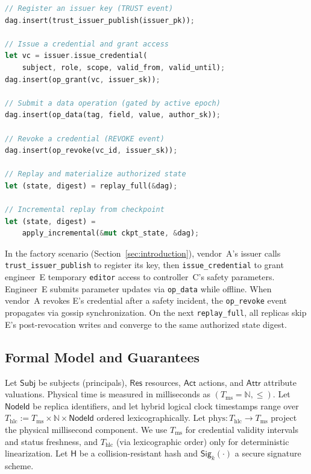 \documentclass[10pt,journal,compsoc]{IEEEtran}
\begin{document}
\begin{lstlisting}[language=Rust,caption={Simplified API surface of \textit{equack-core}.},label={lst:api}]
// Register an issuer key (TRUST event)
dag.insert(trust_issuer_publish(issuer_pk));

// Issue a credential and grant access
let vc = issuer.issue_credential(
    subject, role, scope, valid_from, valid_until);
dag.insert(op_grant(vc, issuer_sk));

// Submit a data operation (gated by active epoch)
dag.insert(op_data(tag, field, value, author_sk));

// Revoke a credential (REVOKE event)
dag.insert(op_revoke(vc_id, issuer_sk));

// Replay and materialize authorized state
let (state, digest) = replay_full(&dag);

// Incremental replay from checkpoint
let (state, digest) =
    apply_incremental(&mut ckpt_state, &dag);
\end{lstlisting}

In the factory scenario (Section~\ref{sec:introduction}), vendor~A's issuer calls \texttt{trust\_issuer\_publish} to register its key, then \texttt{issue\_credential} to grant engineer~E temporary \texttt{editor} access to controller~C's safety parameters. Engineer~E submits parameter updates via \texttt{op\_data} while offline. When vendor~A revokes E's credential after a safety incident, the \texttt{op\_revoke} event propagates via gossip synchronization. On the next \texttt{replay\_full}, all replicas skip E's post-revocation writes and converge to the same authorized state digest.


\subsection{Formal Model and Guarantees}\label{subsec:formal-model}

Let $\mathsf{Subj}$ be subjects (principals), $\mathsf{Res}$ resources, $\mathsf{Act}$ actions, and $\mathsf{Attr}$ attribute valuations.
Physical time is measured in milliseconds as $(T_{\mathrm{ms}}=\mathbb{N}, \le)$.
Let $\mathsf{NodeId}$ be replica identifiers, and let hybrid logical clock timestamps range over
$T_{\mathrm{hlc}} := T_{\mathrm{ms}} \times \mathbb{N} \times \mathsf{NodeId}$ ordered lexicographically.
Let $\mathrm{phys} : T_{\mathrm{hlc}} \to T_{\mathrm{ms}}$ project the physical millisecond component.
We use $T_{\mathrm{ms}}$ for credential validity intervals and status freshness, and $T_{\mathrm{hlc}}$ (via lexicographic order) only for deterministic linearization.
Let $\mathsf{H}$ be a collision-resistant hash and $\mathsf{Sig}_k(\cdot)$ a secure signature scheme.
\end{document}
